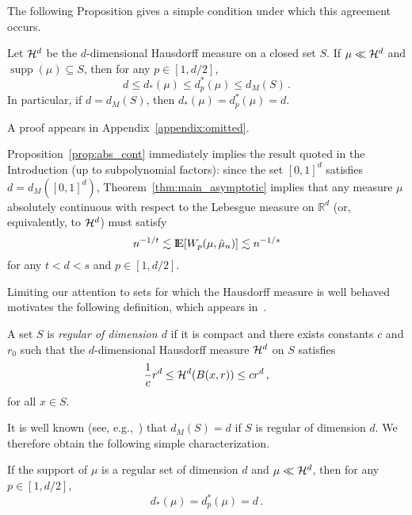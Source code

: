 \documentclass[sts]{imsart}
\newcommand{\RR}{\mathbb{R}}
\DeclareMathOperator{\supp}{supp}
\begin{document}
The following Proposition gives a simple condition under which this agreement occurs.
\begin{proposition}\label{prop:abs_cont}
Let $\mathcal{H}^d$ be the $d$-dimensional Hausdorff measure on a closed set $S$.
If $\mu \ll \mathcal{H}^d$ and $\supp(\mu) \subseteq S$, then for any $p \in [1, d/2]$,
\begin{equation*}
d \leq d_*(\mu) \leq d^*_p(\mu) \leq d_M(S)\,.
\end{equation*}
In particular, if $d = d_M(S)$, then $d_*(\mu) = d^*_p(\mu) = d$.
\end{proposition}
A proof appears in Appendix~\ref{appendix:omitted}.

Proposition~\ref{prop:abs_cont} immediately implies the result quoted in the Introduction (up to subpolynomial factors): since the set $[0,1]^d$ satisfies $d = d_M([0, 1]^d)$, Theorem~\ref{thm:main_asymptotic} implies that any measure $\mu$ absolutely continuous with respect to the Lebesgue measure on $\RR^d$ (or, equivalently, to $\mathcal{H}^d$) must satisfy
\begin{equation*}
n^{-1/t} \lesssim {\rm I}\kern-0.18em{\rm E}[W_p(\mu, \hat \mu_n)] \lesssim n^{-1/s}
\end{equation*}
for any $t < d < s$ and $p \in [1, d/2]$.

Limiting our attention to sets for which the Hausdorff measure is well behaved motivates the following definition, which appears in~\cite{GraLus07}.
\begin{definition}
A set $S$ is \emph{regular of dimension $d$} if it is compact and there exists constants $c$ and $r_0$ such that the $d$-dimensional Hausdorff measure $\mathcal{H}^d$ on $S$ satisfies
\begin{equation*}
\frac 1 c r^d \leq \mathcal{H}^d(B(x, r)) \leq c r^d\,,
\end{equation*}
for all $x \in S$.
\end{definition}

It is well known (see, e.g.,~\cite[Theorem~5.7]{Mat99}) that $d_M(S) = d$ if $S$ is regular of dimension $d$.
We therefore obtain the following simple characterization.
\begin{proposition}\label{prop:regular}
If the support of $\mu$ is a regular set of dimension $d$ and $\mu \ll \mathcal{H}^d$, then for any $p \in [1, d/2]$,
\begin{equation*}
d_*(\mu) = d_p^*(\mu) = d\,.
\end{equation*}
\end{proposition}
\end{document}
